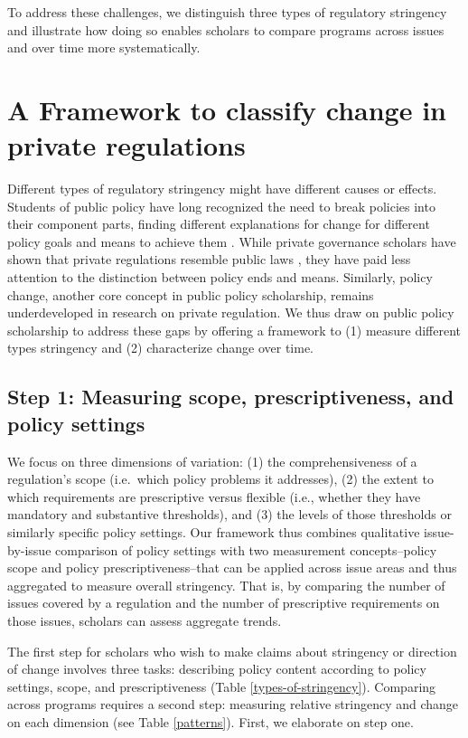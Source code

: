 \documentclass[
      12pt,
            Review ]{article}
\begin{document}
To address these challenges, we distinguish three types of regulatory
stringency and illustrate how doing so enables scholars to compare
programs across issues and over time more systematically.

\section{A Framework to classify change in private
regulations}\label{a-framework-to-classify-change-in-private-regulations}

Different types of regulatory stringency might have different causes or
effects. Students of public policy have long recognized the need to
break policies into their component parts, finding different
explanations for change for different policy goals and means to achieve
them \citep{Cashore1997, Hall1993, Weimer2017}. While private governance
scholars have shown that private regulations resemble public laws
\citep[\citet{Meidinger2006}]{Meidinger2003}, they have paid less
attention to the distinction between policy ends and means. Similarly,
policy change, another core concept in public policy scholarship,
remains underdeveloped in research on private regulation. We thus draw
on public policy scholarship to address these gaps by offering a
framework to (1) measure different types stringency and (2) characterize
change over time.

\subsection{Step 1: Measuring scope, prescriptiveness, and policy
settings}\label{step-1-measuring-scope-prescriptiveness-and-policy-settings}

We focus on three dimensions of variation: (1) the comprehensiveness of
a regulation's scope (i.e.~which policy problems it addresses), (2) the
extent to which requirements are prescriptive versus flexible (i.e.,
whether they have mandatory and substantive thresholds), and (3) the
levels of those thresholds or similarly specific policy settings. Our
framework thus combines qualitative issue-by-issue comparison of policy
settings with two measurement concepts--policy scope and policy
prescriptiveness--that can be applied across issue areas and thus
aggregated to measure overall stringency. That is, by comparing the
number of issues covered by a regulation and the number of prescriptive
requirements on those issues, scholars can assess aggregate trends.

The first step for scholars who wish to make claims about stringency or
direction of change involves three tasks: describing policy content
according to policy settings, scope, and prescriptiveness (Table
\ref{types-of-stringency}). Comparing across programs requires a second
step: measuring relative stringency and change on each dimension (see
Table \ref{patterns}). First, we elaborate on step one.
\end{document}
